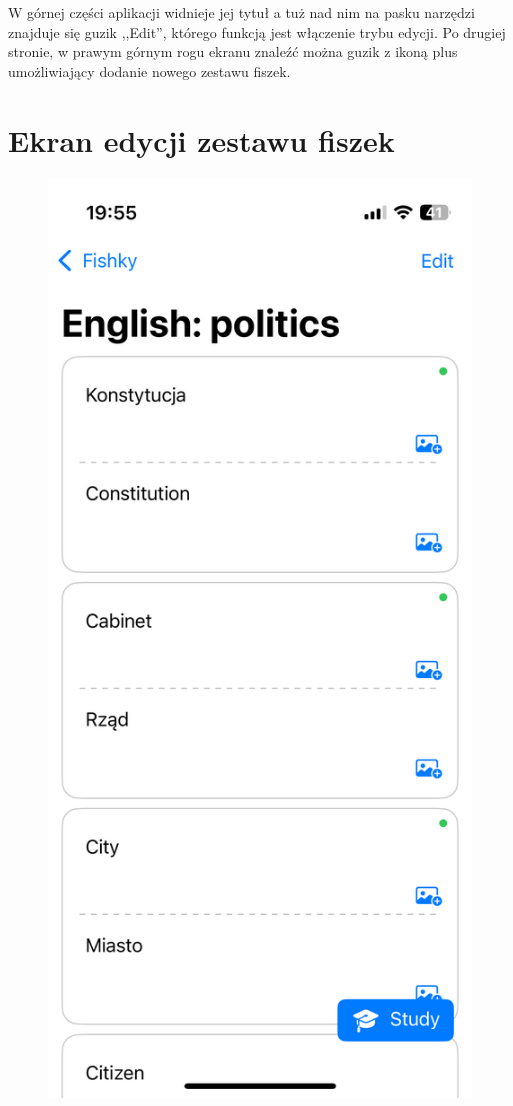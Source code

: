 \documentclass[final,a4paper,openany,12pt]{mwbk}
\begin{document}
W górnej części aplikacji widnieje jej tytuł a tuż nad nim na pasku narzędzi znajduje się guzik ,,Edit'', którego funkcją jest włączenie trybu edycji. Po drugiej stronie, w prawym górnym rogu ekranu znaleźć można guzik z ikoną plus umożliwiający dodanie nowego zestawu fiszek.


\section{Ekran edycji zestawu fiszek}

\begin{figure}[h]
\centering
\begin{minipage}{0.5\textwidth}
  \centering
\includegraphics[width=.75\linewidth]{img/fishky3.PNG}

\end{minipage}
\end{figure}
\end{document}

